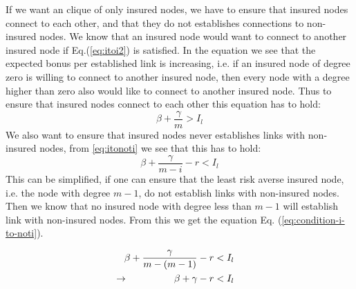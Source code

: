 If we want an clique of only insured nodes, we have to ensure that insured nodes connect to each other, and that they do not establishes connections to non-insured nodes.
We know that an insured node would want to connect to another insured node if  Eq.(\ref{eq:itoi2}) is satisfied. 
In the equation we see that the expected bonus per established link is increasing, i.e. if an insured node of degree zero is willing to connect to another insured node, then every node with a degree higher than zero also would like to connect to another insured node. Thus to ensure that insured nodes connect to each other this equation has to hold:
\begin{equation}
\beta+\frac{\gamma}{m}>I_{l}
\label{eq:conditionitoi}
\end{equation}
We also want to ensure that insured nodes never establishes links with non-insured nodes, from \ref{eq:itonoti} we see that this has to hold:
\begin{equation}
\beta+\frac{\gamma}{m-i}-r < I_{l}
\label{eq:conditionitonoti}
\end{equation}
This can be simplified, if one can ensure that the least risk averse insured node, i.e. the node with degree $m-1$, do not establish links with non-insured nodes. Then we know that no insured node with degree less than $m-1$ will establish link with non-insured nodes. From this we get the equation Eq. (\ref{eq:condition-i-to-noti}).

\begin{eqnarray}
\beta+\frac{\gamma}{m-(m-1)}-r&<I_{l} \nonumber\\
\llap{$\rightarrow$\hspace{50pt}} \beta+\gamma-r&<I_{l}
\label{eq:condition-i-to-noti}
\end{eqnarray}

